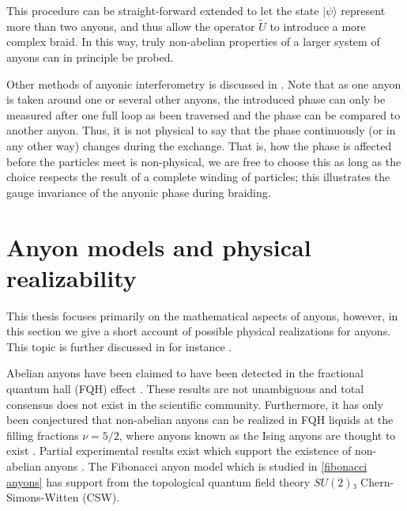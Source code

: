 This procedure can be straight-forward extended to let the state $|ψ⟩$ represent more than two anyons, and thus allow the operator $\widetilde{U}$ to introduce a more complex braid. In this way, truly non-abelian properties of a larger system of anyons can in principle be probed.

Other methods of anyonic interferometry is discussed in \cite{bonderson}. Note that as one anyon is taken around one or several other anyons, the introduced phase can only be measured after one full loop as been traversed and the phase can be compared to another anyon. Thus, it is not physical to say that the phase continuously (or in any other way) changes during the exchange. That is, how the phase is affected before the particles meet is non-physical, we are free to choose this as long as the choice respects the result of a complete winding of particles; this illustrates the gauge invariance of the anyonic phase during braiding.









































\section{Anyon models and physical realizability}\label{sec:models and realizability}

This thesis focuses primarily on the mathematical aspects of anyons, however, in this section we give a short account of possible physical realizations for anyons. This topic is further discussed in for instance \cite{nayak,topological quantum compiling,slingerland bais}.

Abelian anyons have been claimed to have been detected in the fractional quantum hall (FQH) effect \cite{abelian fqh}. These results are not unambiguous and total consensus does not exist in the scientific community. Furthermore, it has only been conjectured that non-abelian anyons can be realized in FQH liquids at the filling fractions $\nu = 5/2$, where anyons known as the Ising anyons are thought to exist \cite{wang book}. Partial experimental results exist which support the existence of non-abelian anyons \cite{non-abelian experimental}. The Fibonacci anyon model which is studied in \cref{fibonacci anyons} has support from the topological quantum field theory $SU(2)₃$ Chern-Simons-Witten (CSW). \cite{nayak}

